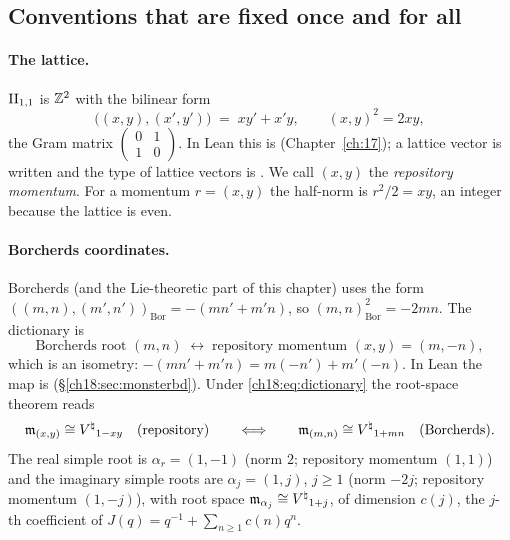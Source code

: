 \subsection{Conventions that are fixed once and for all}\label{ch18:sec:conventions}

\paragraph{The lattice.}  $\mathrm{II}_{1,1}$ is ${\mathbb{Z}}^2$ with the bilinear form
\begin{equation}\label{ch18:eq:repform}
  \bigl((x,y),(x',y')\bigr) \;=\; xy'+x'y,\qquad (x,y)^2=2xy,
\end{equation}
the Gram matrix $\left(\begin{smallmatrix}0&1\\1&0\end{smallmatrix}\right)$.  In Lean this is
 (Chapter~\ref{ch:17}); a lattice vector is written \lean{![x, y]} and the
type of lattice vectors is .  We call $(x,y)$ the \emph{repository
momentum}.  For a momentum $r=(x,y)$ the half-norm is $r^2/2=xy$, an integer because the lattice is
even.

\paragraph{Borcherds coordinates.}  Borcherds (and the Lie-theoretic part of this chapter) uses the
form $((m,n),(m',n'))_{\mathrm{Bor}}=-(mn'+m'n)$, so $(m,n)^2_{\mathrm{Bor}}=-2mn$.  The dictionary is
\begin{equation}\label{ch18:eq:dictionary}
  \text{Borcherds root }(m,n)\;\longleftrightarrow\;\text{repository momentum }(x,y)=(m,-n),
\end{equation}
which is an isometry: $-(mn'+m'n)=m(-n')+m'(-n)$.  In Lean the map is 
(\S\ref{ch18:sec:monsterbd}).  Under \eqref{ch18:eq:dictionary} the root-space theorem reads
\begin{equation*}
  \mathfrak{m}_{(x,y)}\cong{V^{\natural}}_{1-xy}\quad\text{(repository)}\qquad\Longleftrightarrow\qquad
  \mathfrak{m}_{(m,n)}\cong{V^{\natural}}_{1+mn}\quad\text{(Borcherds)}.
\end{equation*}
The real simple root is $\alpha_r=(1,-1)$ (norm $2$; repository momentum $(1,1)$) and the imaginary
simple roots are $\alpha_j=(1,j)$, $j\ge1$ (norm $-2j$; repository momentum $(1,-j)$), with root
space $\mathfrak{m}_{\alpha_j}\cong{V^{\natural}}_{1+j}$, of dimension $c(j)$, the $j$-th coefficient of
$J(q)=q^{-1}+\sum_{n\ge1}c(n)q^n$.


